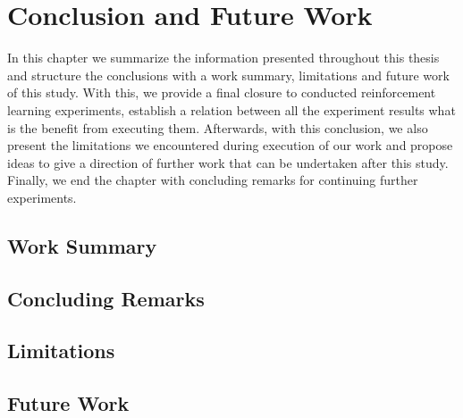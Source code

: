 
\chapter{Conclusion and Future Work}\label{chapter:conclusion_and_future_work}

In this chapter we summarize the information presented throughout this thesis and structure the conclusions with a work summary, limitations and future work of this study. With this, we provide a final closure to conducted reinforcement learning experiments, establish a relation between all the experiment results what is the benefit from executing them. Afterwards, with this conclusion, we also present the limitations we encountered during execution of our work and propose ideas to give a direction of further work that can be undertaken after this study. Finally, we end the chapter with concluding remarks for continuing further experiments.


\section{Work Summary}

\section{Concluding Remarks}

\section{Limitations}

\section{Future Work}